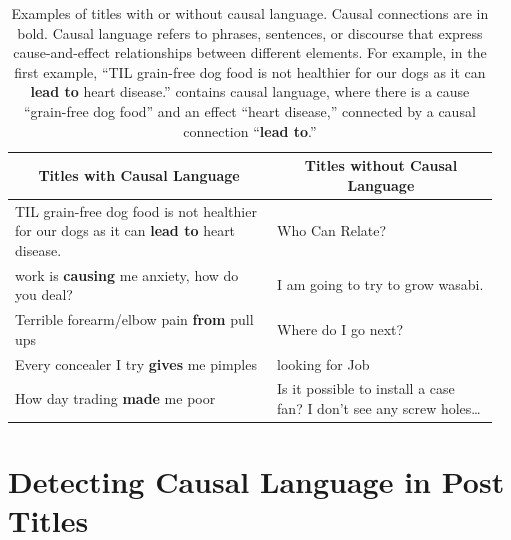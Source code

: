 \documentclass[acmsmall]{acmart}
\begin{document}
\begin{table}

  \begin{tabular}{p{0.52\linewidth} p{0.44\linewidth}}
\toprule

 \multicolumn{1}{c}{\centering Titles with Causal Language} & \multicolumn{1}{c}{\centering Titles without Causal Language} \\

\midrule

TIL grain-free dog food is not healthier for our dogs as it can \textbf{lead to} heart disease.  & Who Can Relate? \\
\addlinespace[2.5pt]

work is \textbf{causing} me anxiety, how do you deal?  & I am going to try to grow wasabi. \\
\addlinespace[2.5pt]
 
Terrible forearm/elbow pain \textbf{from} pull ups  & Where do I go next? \\
\addlinespace[2.5pt]
 
Every concealer I try \textbf{gives} me pimples  & looking for Job \\
\addlinespace[2.5pt]
 
How day trading \textbf{made} me poor  & Is it possible to install a case fan? I don’t see any screw holes… \\
    
    \bottomrule
  \end{tabular}

  \caption{Examples of titles with or without causal language. Causal connections are in bold. Causal language refers to phrases, sentences, or discourse that express cause-and-effect relationships between different elements. For example, in the first example, ``TIL grain-free dog food is not healthier for our dogs as it can \textbf{lead to} heart disease.'' contains causal language, where there is a cause ``grain-free dog food'' and an effect ``heart disease,'' connected by a causal connection ``\textbf{lead to}.'' }
  \label{tab:CL_text}
\end{table}










\section{Detecting Causal Language in Post Titles}
\end{document}
